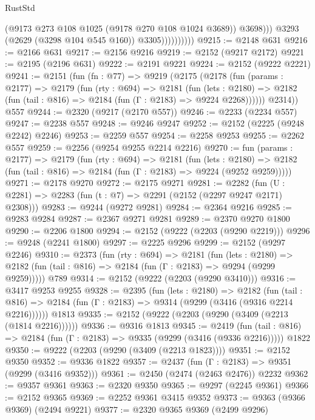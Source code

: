 \begin{lexlean}{RustStd}
\begin{coremodule}
                              (@9173 @273 @108 @1025 (@9178 @270 @108 @1024 @3689))
                              @3698)))
                        @3293
                        (@2629 (@3298 @104 @545 @160))
                        @3305))))))))))
@9215 := @2148 @631
@9216 := @2166 @631
@9217 := @2156 @9216
@9219 := @2152 (@9217 @2172)
@9221 := @2195 (@2196 @631)
@9222 := @2191 @9221
@9224 := @2152 (@9222 @2221)
@9241 := @2151
    (fun (fn : @77) =>
    @9219
      (@2175
        (@2178
          (fun (params : @2177) =>
          @2179
            (fun (rty : @694) =>
            @2181
              (fun (lets : @2180) =>
              @2182 (fun (tail : @816) => @2184 (fun (Γ : @2183) => @9224 @2268))))))
        @2314))
    @557
@9244 := @2320 (@9217 (@2170 @557))
@9246 := @2233 (@2234 @557)
@9247 := @2238 @557
@9248 := @9246 @9247
@9252 := @2152 (@2225 (@9248 @2242) @2246)
@9253 := @2259 @557
@9254 := @2258 @9253
@9255 := @2262 @557
@9259 := @2256 (@9254 @9255 @2214 @2216)
@9270 := fun (params : @2177) =>
  @2179
    (fun (rty : @694) =>
    @2181
      (fun (lets : @2180) =>
      @2182 (fun (tail : @816) => @2184 (fun (Γ : @2183) => @9224 (@9252 @9259)))))
@9271 := @2178 @9270
@9272 := @2175 @9271
@9281 := @2282 (fun (U : @2281) => @2283 (fun (t : @7) => @2291 (@2152 (@2297 @9247 @2171) @2308)))
@9283 := @9244 (@9272 @9281)
@9284 := @2364 @9216
@9285 := @9283 @9284
@9287 := @2367 @9271 @9281
@9289 := @2370 @9270 @1800
@9290 := @2206 @1800
@9294 := @2152 (@9222 (@2203 (@9290 @2219)))
@9296 := @9248 (@2241 @1800)
@9297 := @2225 @9296
@9299 := @2152 (@9297 @2246)
@9310 := @2373
    (fun (rty : @694) =>
    @2181
      (fun (lets : @2180) =>
      @2182 (fun (tail : @816) => @2184 (fun (Γ : @2183) => @9294 (@9299 @9259)))))
    @789
@9314 := @2152 (@9222 (@2203 (@9290 @3410)))
@9316 := @3417 @9253 @9255
@9328 := @2395
    (fun (lets : @2180) =>
    @2182
      (fun (tail : @816) => @2184 (fun (Γ : @2183) => @9314 (@9299 (@3416 (@9316 @2214 @2216))))))
    @1813
@9335 := @2152 (@9222 (@2203 (@9290 (@3409 (@2213 (@1814 @2216))))))
@9336 := @9316 @1813
@9345 := @2419
    (fun (tail : @816) => @2184 (fun (Γ : @2183) => @9335 (@9299 (@3416 (@9336 @2216)))))
    @1822
@9350 := @9222 (@2203 (@9290 (@3409 (@2213 @1823))))
@9351 := @2152 @9350
@9352 := @9336 @1822
@9357 := @2437 (fun (Γ : @2183) => @9351 (@9299 (@3416 @9352)))
@9361 := @2450 (@2474 (@2463 @2476)) @2232
@9362 := @9357 @9361
@9363 := @2320 @9350
@9365 := @9297 (@2245 @9361)
@9366 := @2152 @9365
@9369 := @2252 @9361 @3415 @9352
@9373 := @9363 (@9366 @9369) (@2494 @9221)
@9377 := @2320 @9365 @9369 (@2499 @9296)

\end{coremodule}
\end{lexlean}
